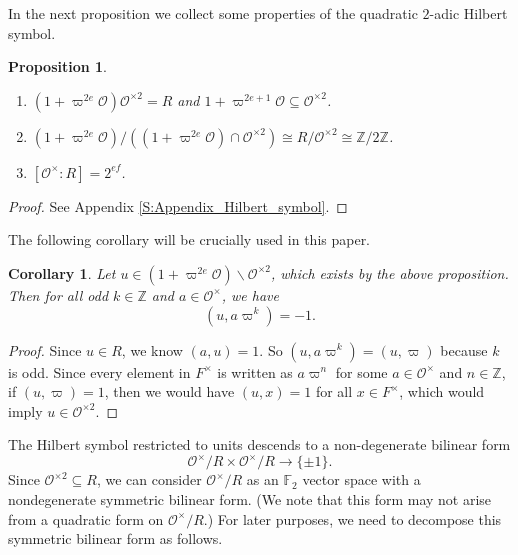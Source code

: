 \documentclass[10pt, letterpaper]{amsart}
\theoremstyle{plain}
\newtheorem{Cor}[equation]{Corollary}
\newtheorem{Prop}[equation]{Proposition}
\theoremstyle{definition}
\numberwithin{equation}{section}
\newcommand{\F}{\mathbb{F}}
\newcommand{\Z}{\mathbb{Z}}
\newcommand{\Ocal}{\mathcal{O}}
\begin{document}
In the next proposition we collect some properties of the quadratic $2$-adic Hilbert symbol.
\begin{Prop}\label{P:property_Hilber_symbol_not_in_Appendix}$ $
	\begin{enumerate}
		\item $(1+\varpi^{2e}\Ocal)\Ocal^{\times 2}= R$ and $1+\varpi^{2e+1}\Ocal\subseteq \Ocal^{\times 2}$. \label{ORad}
		\item $(1+\varpi^{2e}\Ocal)\slash((1+\varpi^{2e}\Ocal)\cap\Ocal^{\times 2})\cong R\slash\Ocal^{\times 2}\cong\Z\slash 2\Z$.
		\item $[\Ocal^{\times}:R]=2^{ef}$.
	\end{enumerate}
\end{Prop}
\begin{proof}
See Appendix \ref{S:Appendix_Hilbert_symbol}.
\end{proof}

The following corollary will be crucially used in this paper.
\begin{Cor}\label{C:Hilbert_symbol_unique_element_integral_radical}
Let $u\in (1+\varpi^{2e}\Ocal)\smallsetminus\Ocal^{\times 2}$, which exists by the above proposition. Then for all odd $k\in\Z$ and $a\in\Ocal^\times$, we have
\[
(u, a\varpi^k)=-1.
\]
\end{Cor}
\begin{proof}
Since $u\in R$, we know $(a, u)=1$. So $(u, a\varpi^k)=(u, \varpi)$ because $k$ is odd. Since every element in $F^\times$ is written as $a\varpi^n$ for some $a\in \Ocal^\times$ and $n\in\Z$, if $(u, \varpi)=1$, then we would have $(u, x)=1$ for all $x\in F^\times$, which would imply $u\in \Ocal^{\times 2}$.
\end{proof}


The Hilbert symbol restricted to units descends to a non-degenerate bilinear form
\[
\Ocal^\times\slash R\times\Ocal^\times\slash R\longrightarrow\{\pm 1\}.
\]
Since $\Ocal^{\times 2}\subseteq R$, we can consider $\Ocal^\times\slash R$ as an $\F_2$ vector space with a nondegenerate symmetric bilinear form. (We note that this form may not arise from a quadratic form on $\Ocal^\times\slash R$.) For later purposes, we need to decompose this symmetric bilinear form as follows.
\end{document}
